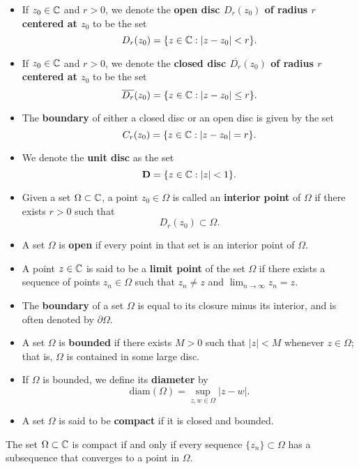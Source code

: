 \documentclass[11pt,a4paper]{book}
\begin{document}
\begin{itemize}
    \item If \( {z}_{0} \in \mathbb{C}  \) and \( r > 0  \), we denote the \textbf{open disc \( {D}_{r}({z}_{0}) \) of radius \( r  \) centered at \( {z}_{0} \)} to be the set  
    \[  {D}_{r}({z}_{0}) = \{ z \in \mathbb{C} : | z - {z}_{0} | < r \}. \]
\item If \( {z}_{0} \in \mathbb{C}  \) and \( r > 0  \), we denote the \textbf{closed disc \( \overline{{D}_{r}}({z}_{0})  \) of radius \( r  \) centered at \( {z}_{0} \)} to be the set 
    \[ \overline{{D}_{r}}({z}_{0}) = \{ z \in \mathbb{C} : | z - {z}_{0} |  \leq r  \}.    \]
\item The \textbf{boundary} of either a closed disc or an open disc is given by the set 
    \[  {C}_{r}({z}_{0}) = \{ z \in \mathbb{C} : | z - {z}_{0} | = r  \}. \]
\item We denote the \textbf{unit disc} as the set
    \[  \mathbf{D} = \{ z \in \mathbb{C} : | z  |  < 1  \}. \]
    \item Given a set \( \Omega \subset \mathbb{C}  \), a point \( {z}_{0} \in \Omega  \) is called an \textbf{interior point} of \( \Omega \) if there exists \( r > 0  \) such that
    \[  {D}_{r}({z}_{0}) \subset \Omega. \]
\item A set \( \Omega  \) is \textbf{open} if every point in that set is an interior point of \( \Omega \). 
\item A point \( z \in \mathbb{C}  \) is said to be a \textbf{limit point} of the set \( \Omega  \) if there exists a sequence of points \( {z}_{n} \in \Omega \) such that \( {z}_{n} \neq z  \) and \( \lim_{ n \to \infty  }  {z}_{n} = z  \).
\item The \textbf{boundary} of a set \( \Omega \) is equal to its closure minus its interior, and is often denoted by \( \partial \Omega \). 
\item A set \( \Omega  \) is \textbf{bounded} if there exists \( M > 0  \) such that \( | z  |  < M  \) whenever \( z \in \Omega  \); that is, \( \Omega  \) is contained in some large disc.
\item If \( \Omega  \) is bounded, we define its \textbf{diameter} by
    \[  \text{diam}(\Omega) = \sup_{z,w \in \Omega} | z - w  |.  \]
\item A set \( \Omega  \) is said to be \textbf{compact} if it is closed and bounded.
\end{itemize}

\begin{theorem}[ ]
    The set \( \Omega \subset \mathbb{C}  \) is compact if and only if every sequence \( \{ {z}_{n} \}  \subset \Omega  \) has a subsequence that converges to a point in \( \Omega \).
\end{theorem}
\end{document}
